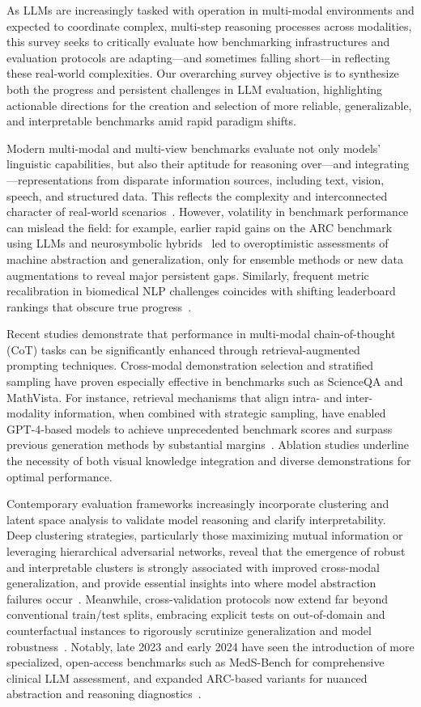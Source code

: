 \documentclass[sigconf]{acmart}
\begin{document}
As LLMs are increasingly tasked with operation in multi-modal environments and expected to coordinate complex, multi-step reasoning processes across modalities, this survey seeks to critically evaluate how benchmarking infrastructures and evaluation protocols are adapting---and sometimes falling short---in reflecting these real-world complexities. Our overarching survey objective is to synthesize both the progress and persistent challenges in LLM evaluation, highlighting actionable directions for the creation and selection of more reliable, generalizable, and interpretable benchmarks amid rapid paradigm shifts.

Modern multi-modal and multi-view benchmarks evaluate not only models' linguistic capabilities, but also their aptitude for reasoning over---and integrating---representations from disparate information sources, including text, vision, speech, and structured data. This reflects the complexity and interconnected character of real-world scenarios~\cite{ref79,ref85,ref92,ref94,ref95}. However, volatility in benchmark performance can mislead the field: for example, earlier rapid gains on the ARC benchmark using LLMs and neurosymbolic hybrids~\cite{ref92} led to overoptimistic assessments of machine abstraction and generalization, only for ensemble methods or new data augmentations to reveal major persistent gaps. Similarly, frequent metric recalibration in biomedical NLP challenges coincides with shifting leaderboard rankings that obscure true progress~\cite{ref94,ref95}.

Recent studies demonstrate that performance in multi-modal chain-of-thought (CoT) tasks can be significantly enhanced through retrieval-augmented prompting techniques. Cross-modal demonstration selection and stratified sampling have proven especially effective in benchmarks such as ScienceQA and MathVista. For instance, retrieval mechanisms that align intra- and inter-modality information, when combined with strategic sampling, have enabled GPT-4-based models to achieve unprecedented benchmark scores and surpass previous generation methods by substantial margins~\cite{ref85}. Ablation studies underline the necessity of both visual knowledge integration and diverse demonstrations for optimal performance.

Contemporary evaluation frameworks increasingly incorporate clustering and latent space analysis to validate model reasoning and clarify interpretability. Deep clustering strategies, particularly those maximizing mutual information or leveraging hierarchical adversarial networks, reveal that the emergence of robust and interpretable clusters is strongly associated with improved cross-modal generalization, and provide essential insights into where model abstraction failures occur~\cite{ref79}. Meanwhile, cross-validation protocols now extend far beyond conventional train/test splits, embracing explicit tests on out-of-domain and counterfactual instances to rigorously scrutinize generalization and model robustness~\cite{ref94,ref95}. Notably, late 2023 and early 2024 have seen the introduction of more specialized, open-access benchmarks such as MedS-Bench for comprehensive clinical LLM assessment, and expanded ARC-based variants for nuanced abstraction and reasoning diagnostics~\cite{ref92,ref95}.
\end{document}
